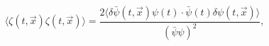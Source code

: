 \begin{equation}
  \langle\zeta(t,\vec{x})\zeta(t,\vec{x})\rangle
  =\frac{2\langle\delta\bar{\psi}(t,\vec{x})\psi(t)\cdot
    \bar{\psi}(t)\delta\psi(t,\vec{x})\rangle}
{(\bar{\psi}\psi)^2},
\end{equation}

